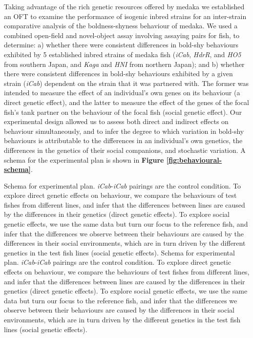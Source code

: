 \documentclass[
]{book}
\begin{document}
Taking advantage of the rich genetic resources offered by medaka we established an OFT to examine the performance of isogenic inbred strains for an inter-strain comparative analysis of the boldness-shyness behaviour of medaka. We used a combined open-field and novel-object assay involving assaying pairs for fish, to determine: a) whether there were consistent differences in bold-shy behaviours exhibited by 5 established inbred strains of medaka fish (\emph{iCab}, \emph{HdrR}, and \emph{HO5} from southern Japan, and \emph{Kaga} and \emph{HNI} from northern Japan); and b) whether there were consistent differences in bold-shy behaviours exhibited by a given strain (\emph{iCab}) dependent on the strain that it was partnered with. The former was intended to measure the effect of an individual's own genes on its behaviour (a direct genetic effect), and the latter to measure the effect of the genes of the focal fish's tank partner on the behaviour of the focal fish (social genetic effect). Our experimental design allowed us to assess both direct and indirect effects on behaviour simultaneously, and to infer the degree to which variation in bold-shy behaviours is attributable to the differences in an individual's own genetics, the differences in the genetics of their social companions, and stochastic variation. A schema for the experimental plan is shown in \textbf{Figure \ref{fig:behavioural-schema}}.

Schema for experimental plan. \emph{iCab}-\emph{iCab} pairings are the control condition. To explore direct genetic effects on behaviour, we compare the behaviours of test fishes from different lines, and infer that the differences between lines are caused by the differences in their genetics (direct genetic effects). To explore social genetic effects, we use the same data but turn our focus to the reference fish, and infer that the differences we observe between their behaviours are caused by the differences in their social environments, which are in turn driven by the different genetics in the test fish lines (social genetic effects). Schema for experimental plan. \emph{iCab}-\emph{iCab} pairings are the control condition. To explore direct genetic effects on behaviour, we compare the behaviours of test fishes from different lines, and infer that the differences between lines are caused by the differences in their genetics (direct genetic effects). To explore social genetic effects, we use the same data but turn our focus to the reference fish, and infer that the differences we observe between their behaviours are caused by the differences in their social environments, which are in turn driven by the different genetics in the test fish lines (social genetic effects).
\end{document}
